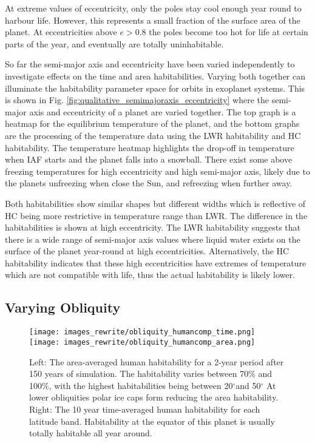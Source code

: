 \documentclass[12pt, onecolumn]{revtex4-2}    %
\newcommand{\degrees}{\ensuremath{^{\circ}}}
\begin{document}
At extreme values of eccentricity, only the poles stay cool enough year round to harbour life.
However, this represents a small fraction of the surface area of the planet.
At eccentricities above $e > 0.8$ the poles become too hot for life at certain parts of the year, and eventually are totally uninhabitable.


So far the semi-major axis and eccentricity have been varied independently to investigate effects on the time and area habitabilities.
Varying both together can illuminate the habitability parameter space for orbits in exoplanet systems.
This is shown in Fig. \ref{fig:qualitative_semimajoraxis_eccentricity} where the semi-major axis and eccentricity of a planet are varied together.
The top graph is a heatmap for the equilibrium temperature of the planet, and the bottom graphs are the processing of the temperature data using the LWR habitability and HC habitability.
The temperature heatmap highlights the drop-off in temperature when IAF starts and the planet falls into a snowball.
There exist some above freezing temperatures for high eccentricity and high semi-major axis, likely due to the planets unfreezing when close the Sun, and refreezing when further away.

Both habitabilities show similar shapes but different widths which is reflective of HC being more restrictive in temperature range than LWR.
The difference in the habitabilities is shown at high eccentricity.
The LWR habitability suggests that there is a wide range of semi-major axis values where liquid water exists on the surface of the planet year-round at high eccentricities.
Alternatively, the HC habitability indicates that these high eccentricities have extremes of temperature which are not compatible with life, thus the actual habitability is likely lower.

\subsection{Varying Obliquity} \label{ssec:qualitative_obliquity}
%
\begin{figure}[t]
  \texttt{[image: images\_rewrite/obliquity\_humancomp\_time.png]}
  \texttt{[image: images\_rewrite/obliquity\_humancomp\_area.png]}
  \caption{
    Left: The area-averaged human habitability for a 2-year period after 150 years of simulation.
    The habitability varies between 70\% and 100\%, with the highest habitabilities being between 20\degrees and 50\degrees
    At lower obliquities polar ice caps form reducing the area habitability.
    Right: The 10 year time-averaged human habitability for each latitude band.
    Habitability at the equator of this planet is usually totally habitable all year around.
  }
  \label{fig:qualitative_obliquity}
\end{figure}
\end{document}
